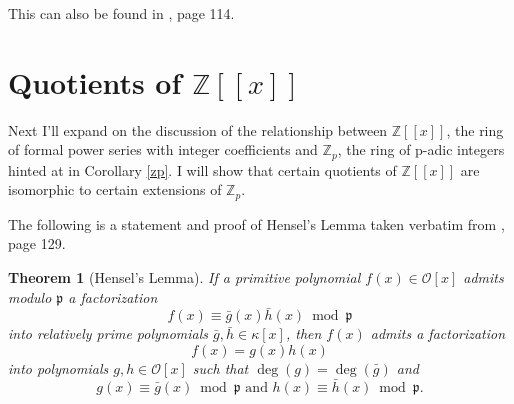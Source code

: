 \documentclass{article}
\newtheorem{theorem}{Theorem}
\begin{document}
This can also be found in \cite{MR1697859}, page 114.  

\section{Quotients of $\mathbb{Z}[[x]]$}

Next I'll expand on the discussion of the relationship between $\mathbb{Z}[[x]]$, the ring of formal power series with integer coefficients and $\mathbb{Z}_p$, the ring of p-adic integers hinted at in Corollary \ref{zp}.  I will show that certain quotients of $\mathbb{Z}[[x]]$ are isomorphic to certain extensions of $\mathbb{Z}_p$.


The following is a statement and proof of Hensel's Lemma taken verbatim from \cite{MR1697859}, page 129.

\begin{theorem}[Hensel's Lemma]\label{hensel}
If a primitive polynomial $f(x) \in \mathcal{O}[x]$ admits modulo $\mathfrak{p}$ a factorization
$$f(x) \equiv \bar{g}(x)\bar{h}(x) \bmod{\mathfrak{p}}$$
into relatively prime polynomials $\bar{g},\bar{h} \in \kappa[x]$, then $f(x)$ admits a factorization
$$f(x) = g(x)h(x)$$
into polynomials $g,h \in \mathcal{O}[x]$ such that $\deg(g) = \deg(\bar{g})$ and
$$g(x) \equiv \bar{g}(x) \bmod{\mathfrak{p}} \mbox{ and } h(x) \equiv \bar{h}(x) \bmod{\mathfrak{p}}.$$
\end{theorem}
\end{document}
